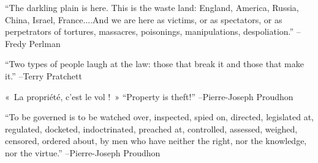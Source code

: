 \documentclass{article}%
\begin{document}
\linebreak%
\vspace{1mm}%
\begin{minipage}{\textwidth}%
\flushleft%
“The darkling plain is here. This is the waste land: England, America, Russia, China, Israel, France....And we are here as victims, or as spectators, or as perpetrators of tortures, massacres, poisonings, manipulations, despoliation.”%
\linebreak%
\vspace{1mm}%
–Fredy Perlman%
\linebreak%
\vspace{1mm}%
\end{minipage}%
\linebreak%
\vspace{1mm}%
\begin{minipage}{\textwidth}%
\flushleft%
“Two types of people laugh at the law: those that break it and those that make it.”%
\linebreak%
\vspace{1mm}%
–Terry Pratchett%
\linebreak%
\vspace{1mm}%
\end{minipage}%
\linebreak%
\vspace{1mm}%
\begin{minipage}{\textwidth}%
\flushleft%
«~La propriété, c'est le vol !~»%
\linebreak%
\vspace{1mm}%
“Property is theft!”%
\linebreak%
–Pierre{-}Joseph Proudhon%
\linebreak%
\vspace{1mm}%
\end{minipage}%
\linebreak%
\vspace{1mm}%
\begin{minipage}{\textwidth}%
\flushleft%
“To be governed is to be watched over, inspected, spied on, directed, legislated at, regulated, docketed, indoctrinated, preached at, controlled, assessed, weighed, censored, ordered about, by men who have neither the right, nor the knowledge, nor the virtue.”%
\linebreak%
\vspace{1mm}%
–Pierre{-}Joseph Proudhon%
\linebreak%
\vspace{1mm}%
\end{minipage}%
\end{document}
